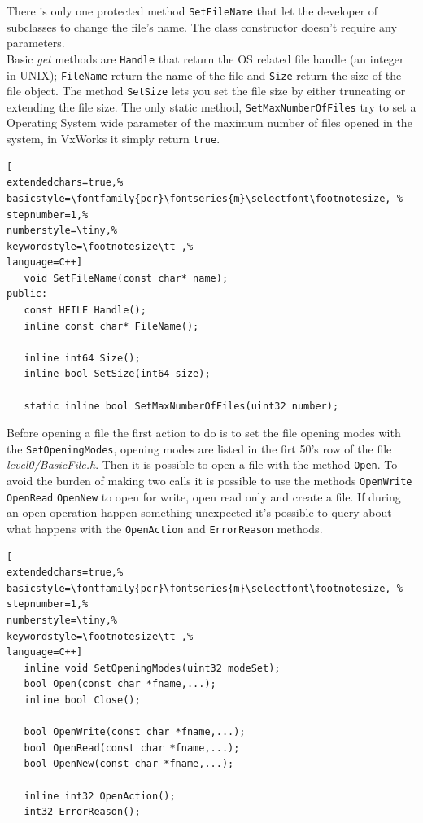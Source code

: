 There is only one protected method \texttt{SetFileName} that let the developer of subclasses to change the file's name. The class constructor doesn't require any parameters.\\


Basic \textit{get} methods are \texttt{Handle} that return the OS related file handle (an integer in UNIX); \texttt{FileName} return the name of the file and \texttt{Size} return the size of the file object. The method \texttt{SetSize} lets you set the file size by either truncating or extending the file size. The only static method, \texttt{SetMaxNumberOfFiles} try to set a Operating System wide parameter of the maximum number of files opened in the system, in VxWorks it simply return \texttt{true}.

\begin{lstlisting}[
extendedchars=true,%
basicstyle=\fontfamily{pcr}\fontseries{m}\selectfont\footnotesize, %
stepnumber=1,%
numberstyle=\tiny,%
keywordstyle=\footnotesize\tt ,%
language=C++]
   void SetFileName(const char* name);
public:
   const HFILE Handle();
   inline const char* FileName();

   inline int64 Size();
   inline bool SetSize(int64 size);

   static inline bool SetMaxNumberOfFiles(uint32 number);
\end{lstlisting}

Before opening a file the first action to do is to set the file opening modes with the \texttt{SetOpeningModes}, opening modes are listed in the firt 50's row of the file \textit{level0/BasicFile.h}. Then it is possible to open a file with the method \texttt{Open}. To avoid the burden of making two calls it is possible to use the methods \texttt{OpenWrite} \texttt{OpenRead} \texttt{OpenNew} to open for write, open read only and create a file. If during an open operation happen something unexpected it's possible to query about what happens with the \texttt{OpenAction} and \texttt{ErrorReason} methods.

\begin{lstlisting}[
extendedchars=true,%
basicstyle=\fontfamily{pcr}\fontseries{m}\selectfont\footnotesize, %
stepnumber=1,%
numberstyle=\tiny,%
keywordstyle=\footnotesize\tt ,%
language=C++]
   inline void SetOpeningModes(uint32 modeSet);
   bool Open(const char *fname,...);
   inline bool Close();

   bool OpenWrite(const char *fname,...);
   bool OpenRead(const char *fname,...);
   bool OpenNew(const char *fname,...);

   inline int32 OpenAction();
   int32 ErrorReason();
\end{lstlisting}

